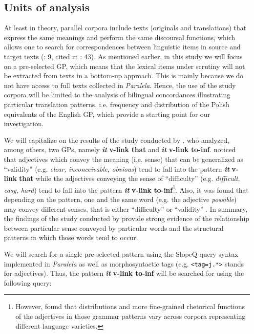 \documentclass[output=paper]{langscibook}
\begin{document}
\subsection{Units of analysis}

At least in theory, parallel corpora include texts (originals and translations) that express the same meanings and perform the same discoursal functions, which allows one to search for correspondences between linguistic items in source and target texts (\citealt{Johansson2007}: 9, cited in \citealt{Marco2019}: 43). As mentioned earlier, in this study we will focus on a pre-selected GP, which means that the lexical items under scrutiny will not be extracted from texts in a bottom-up approach. This is mainly because we do not have access to full texts collected in \textit{Paralela}. Hence, the use of the study corpora will be limited to the analysis of bilingual concordances illustrating particular translation patterns, i.e. frequency and distribution of the Polish equivalents of the English GP, which provide a starting point for our investigation. 

We will capitalize on the results of the study conducted by \citet{Groom2005}, who analyzed, among others, two GPs, namely \textbf{\textit{it} }\textbf{v-link \textbf{{\ADJ}} \textbf{that}} and \textbf{\textit{it} }\textbf{v-link \textbf{{\ADJ}} \textbf{to-}}\textbf{inf}. \citet[259--260]{Groom2005} noticed that adjectives which convey the meaning (i.e. sense) that can be generalized as “validity” (e.g. \textit{clear, inconceivable, obvious}) tend to fall into the pattern \textbf{\textit{it} }\textbf{v-link} \textbf{\textit{{\ADJ}} \textbf{that}} while the adjectives conveying the sense of “difficulty” (e.g. \textit{difficult, easy, hard}) tend to fall into the pattern \textbf{\textit{it} }\textbf{v-link \textbf{{\ADJ}} \textbf{to-}}\textbf{inf}\footnote{However, \citet{Groom2005} found that distributions and more fine-grained rhetorical functions of the adjectives in those grammar patterns vary across corpora representing different language varieties.}. Also, it was found that depending on the pattern, one and the same word (e.g. the adjective \textit{possible}) may convey different senses, that is either “difficulty” or “validity” \citep[259]{Groom2005}. In summary, the findings of the study conducted by \citet{Groom2005} provide strong evidence of the relationship between particular sense conveyed by particular words and the structural patterns in which those words tend to occur.

We will search for a single pre-selected pattern using the SlopeQ query syntax implemented in \textit{Paralela} as well as morphosyntactic tags (e.g. \texttt{<tag=j.*>} stands for adjectives). Thus, the pattern \textbf{\textit{it} }\textbf{v-link \textbf{{\ADJ}} \textbf{to-}}\textbf{inf} will be searched for using the following query:
\end{document}
